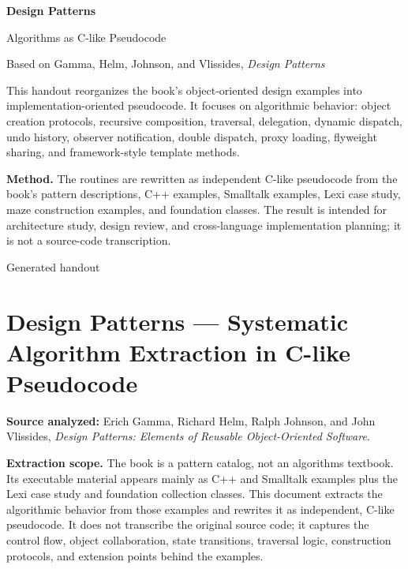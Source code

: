 \documentclass[11pt]{article}
\begin{document}
\hypersetup{pageanchor=false}

\begin{titlepage}
  \centering
  \vspace*{1.4cm}
  {\Huge\bfseries\color{DPBlue}Design Patterns\par}
  \vspace{0.35cm}
  {\LARGE Algorithms as C-like Pseudocode\par}
  \vspace{0.25cm}
  {\large Based on Gamma, Helm, Johnson, and Vlissides, \textit{Design Patterns}\par}
  \vspace{0.9cm}
  \begin{scopebox}
  This handout reorganizes the book's object-oriented design examples into implementation-oriented pseudocode. It focuses on algorithmic behavior: object creation protocols, recursive composition, traversal, delegation, dynamic dispatch, undo history, observer notification, double dispatch, proxy loading, flyweight sharing, and framework-style template methods.
  \end{scopebox}
  \vspace{0.7cm}
  \begin{methodbox}
  \textbf{Method.} The routines are rewritten as independent C-like pseudocode from the book's pattern descriptions, C++ examples, Smalltalk examples, Lexi case study, maze construction examples, and foundation classes. The result is intended for architecture study, design review, and cross-language implementation planning; it is not a source-code transcription.
  \end{methodbox}
  \vfill
  {\large Generated handout\par}
\end{titlepage}

\clearpage
\tableofcontents
\clearpage
\hypersetup{pageanchor=true}

\section{Design Patterns --- Systematic Algorithm Extraction in C-like Pseudocode}\label{design-patterns-systematic-algorithm-extraction-in-c-like-pseudocode}

\textbf{Source analyzed:} Erich Gamma, Richard Helm, Ralph Johnson, and John Vlissides, \emph{Design Patterns: Elements of Reusable Object-Oriented Software}.

\textbf{Extraction scope.} The book is a pattern catalog, not an algorithms textbook. Its executable material appears mainly as C++ and Smalltalk examples plus the Lexi case study and foundation collection classes. This document extracts the algorithmic behavior from those examples and rewrites it as independent, C-like pseudocode. It does not transcribe the original source code; it captures the control flow, object collaboration, state transitions, traversal logic, construction protocols, and extension points behind the examples.
\end{document}
